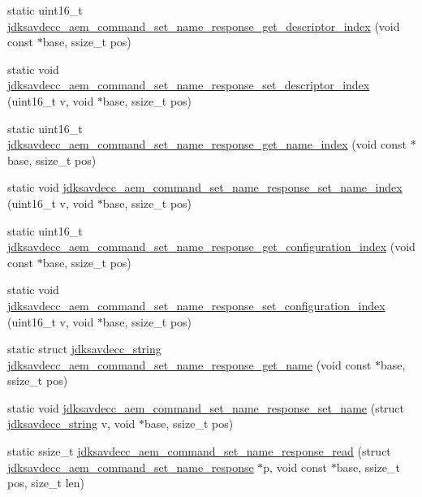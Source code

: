 \begin{DoxyCompactItemize}
\item 
static uint16\+\_\+t \hyperlink{group__command__set__name__response_gac265a30c605f8469b6add2d6f1dd254d}{jdksavdecc\+\_\+aem\+\_\+command\+\_\+set\+\_\+name\+\_\+response\+\_\+get\+\_\+descriptor\+\_\+index} (void const $\ast$base, ssize\+\_\+t pos)
\item 
static void \hyperlink{group__command__set__name__response_gafb3e3170a81ee60767208482a79ec3a4}{jdksavdecc\+\_\+aem\+\_\+command\+\_\+set\+\_\+name\+\_\+response\+\_\+set\+\_\+descriptor\+\_\+index} (uint16\+\_\+t v, void $\ast$base, ssize\+\_\+t pos)
\item 
static uint16\+\_\+t \hyperlink{group__command__set__name__response_gad489dfe5dc5ba74fe0f1e4d01d1e7438}{jdksavdecc\+\_\+aem\+\_\+command\+\_\+set\+\_\+name\+\_\+response\+\_\+get\+\_\+name\+\_\+index} (void const $\ast$base, ssize\+\_\+t pos)
\item 
static void \hyperlink{group__command__set__name__response_ga57bd6a794cc05e03fd4395bfa47ddfb4}{jdksavdecc\+\_\+aem\+\_\+command\+\_\+set\+\_\+name\+\_\+response\+\_\+set\+\_\+name\+\_\+index} (uint16\+\_\+t v, void $\ast$base, ssize\+\_\+t pos)
\item 
static uint16\+\_\+t \hyperlink{group__command__set__name__response_ga955980672080aa93ba297af1ce8cfbde}{jdksavdecc\+\_\+aem\+\_\+command\+\_\+set\+\_\+name\+\_\+response\+\_\+get\+\_\+configuration\+\_\+index} (void const $\ast$base, ssize\+\_\+t pos)
\item 
static void \hyperlink{group__command__set__name__response_ga6c9e7cdf606f462429b92fb86d49495e}{jdksavdecc\+\_\+aem\+\_\+command\+\_\+set\+\_\+name\+\_\+response\+\_\+set\+\_\+configuration\+\_\+index} (uint16\+\_\+t v, void $\ast$base, ssize\+\_\+t pos)
\item 
static struct \hyperlink{structjdksavdecc__string}{jdksavdecc\+\_\+string} \hyperlink{group__command__set__name__response_gada94428543e621860b0cf2b7d7196089}{jdksavdecc\+\_\+aem\+\_\+command\+\_\+set\+\_\+name\+\_\+response\+\_\+get\+\_\+name} (void const $\ast$base, ssize\+\_\+t pos)
\item 
static void \hyperlink{group__command__set__name__response_ga2b83e16312f2fe731574c6b6d7d26d71}{jdksavdecc\+\_\+aem\+\_\+command\+\_\+set\+\_\+name\+\_\+response\+\_\+set\+\_\+name} (struct \hyperlink{structjdksavdecc__string}{jdksavdecc\+\_\+string} v, void $\ast$base, ssize\+\_\+t pos)
\item 
static ssize\+\_\+t \hyperlink{group__command__set__name__response_gaef863bcb2206bfcbd21e95fe8f59869d}{jdksavdecc\+\_\+aem\+\_\+command\+\_\+set\+\_\+name\+\_\+response\+\_\+read} (struct \hyperlink{structjdksavdecc__aem__command__set__name__response}{jdksavdecc\+\_\+aem\+\_\+command\+\_\+set\+\_\+name\+\_\+response} $\ast$p, void const $\ast$base, ssize\+\_\+t pos, size\+\_\+t len)

\end{DoxyCompactItemize}

